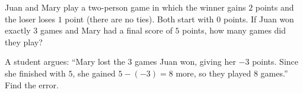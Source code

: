 Juan and Mary play a two-person game in which the winner gains $2$ points and the loser loses $1$ point (there are no ties). Both start with $0$ points. If Juan won exactly $3$ games and Mary had a final score of $5$ points, how many games did they play?

A student argues: ``Mary lost the $3$ games Juan won, giving her $-3$ points. Since she finished with $5$, she gained $5-(-3)=8$ more, so they played $8$ games.'' Find the error.
